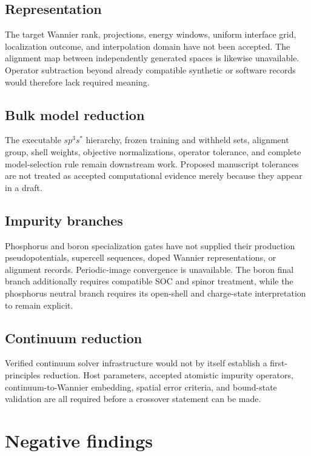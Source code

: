 \subsection{Representation}

The target Wannier rank, projections, energy windows, uniform interface grid,
localization outcome, and interpolation domain have not been accepted. The
alignment map between independently generated spaces is likewise unavailable.
Operator subtraction beyond already compatible synthetic or software records
would therefore lack required meaning.

\subsection{Bulk model reduction}

The executable $sp^3s^{\ast}$ hierarchy, frozen training and withheld sets,
alignment group, shell weights, objective normalizations, operator tolerance,
and complete model-selection rule remain downstream work. Proposed manuscript
tolerances are not treated as accepted computational evidence merely because
they appear in a draft.

\subsection{Impurity branches}

Phosphorus and boron specialization gates have not supplied their production
pseudopotentials, supercell sequences, doped Wannier representations, or
alignment records. Periodic-image convergence is unavailable. The boron final
branch additionally requires compatible SOC and spinor treatment, while the
phosphorus neutral branch requires its open-shell and charge-state
interpretation to remain explicit.

\subsection{Continuum reduction}

Verified continuum solver infrastructure would not by itself establish a
first-principles reduction. Host parameters, accepted atomistic impurity
operators, continuum-to-Wannier embedding, spatial error criteria, and
bound-state validation are all required before a crossover statement can be
made.

\section{Negative findings}

